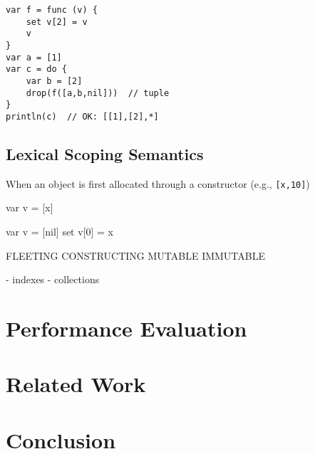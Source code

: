 \documentclass[12pt]{article}
\newcommand{\code}[1] {\texttt{\footnotesize{#1}}}
\newcommand{\lex} {\texttt{Dyn-Lex}\xspace}
\begin{document}
\begin{lstlisting}[caption=A complex example in \lex., label=lst.complex]
var f = func (v) {
    set v[2] = v
    v
}
var a = [1]
var c = do {
    var b = [2]
    drop(f([a,b,nil]))  // tuple
}
println(c)  // OK: [[1],[2],*]
\end{lstlisting}

\subsection{Lexical Scoping Semantics}

When an object is first allocated through a constructor (e.g., \code{[x,10]})

var v = [x]

var v = [nil]
set v[0] = x

FLEETING
CONSTRUCTING
MUTABLE
IMMUTABLE

- indexes
- collections

\section{Performance Evaluation}
\label{sec.eval}

\section{Related Work}
\label{sec.related}

\section{Conclusion}
\label{sec.conclusion}
\end{document}
